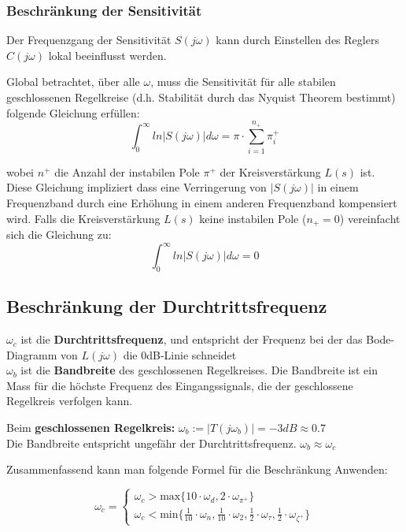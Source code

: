        \subsubsection{Beschränkung der Sensitivität}
            Der Frequenzgang der Sensitivität $S(j\omega)$ kann durch Einstellen des Reglers $C(j\omega)$ lokal beeinflusst werden.
            
            Global betrachtet, über alle $\omega$, muss die Sensitivität für alle stabilen geschlossenen Regelkreise (d.h. Stabilität durch das Nyquist Theorem bestimmt) folgende Gleichung erfüllen:
            \[
            \int_0^\infty ln|S(j\omega)|d\omega = \pi \cdot \sum^{n_+}_{i=1} \pi^+_i
            \]
            
            wobei $n^+$ die Anzahl der instabilen Pole $\pi^+$ der Kreisverstärkung $L(s)$ ist. Diese Gleichung impliziert dass eine Verringerung von $|S(j\omega)|$ in einem Frequenzband durch eine Erhöhung in einem anderen Frequenzband kompensiert wird. Falls die Kreisverstärkung $L(s)$ keine instabilen Pole ($n_+=0$) vereinfacht sich die Gleichung zu:
            \[\int_0^\infty ln|S(j\omega)|d\omega = 0\]
    \subsection{Beschränkung der Durchtrittsfrequenz}
    
        $\omega_c$ ist die \textbf{Durchtrittsfrequenz}, und entspricht der Frequenz bei der das Bode-Diagramm von $L(j\omega)$ die 0dB-Linie schneidet\\
        $\omega_b$ ist die \textbf{Bandbreite} des geschlossenen Regelkreises. Die Bandbreite ist ein Mass für die höchste Frequenz des Eingangssignals, die der geschlossene Regelkreis verfolgen kann.
        
        Beim \textbf{geschlossenen Regelkreis:} $\omega_b:=|T(j\omega_b)|=-3dB\approx 0.7$\\
        Die Bandbreite entspricht ungefähr der Durchtrittsfrequenz. $\boxed{\omega_b\approx\omega_c}$

        Zusammenfassend kann man folgende Formel für die Beschränkung Anwenden:
        
        \[\boxed{\omega_c = 
        \begin{cases}
        \omega_c > \textrm{max}\{10\cdot\omega_d, 2\cdot\omega_{\pi^+}\}\\
        \omega_c < \textrm{min}\{\frac{1}{10}\cdot\omega_n, \frac{1}{10}\cdot \omega_2, \frac{1}{2}\cdot \omega_\tau, \frac{1}{2}\cdot \omega_{\zeta^+}\}
        \end{cases}
        }
        \]
        
